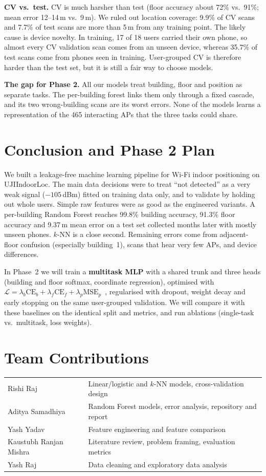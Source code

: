 \documentclass[conference]{IEEEtran}
\begin{document}
\textbf{CV vs.\ test.} CV is much harsher than test (floor accuracy about 72\% vs.\ 91\%; mean error 12--14\,m vs.\ 9\,m). We ruled out
location coverage: 9.9\% of CV scans and 7.7\% of test scans are more than 5\,m from any training point. The likely cause is device novelty.
In training, 17 of 18 users carried their own phone, so almost every CV validation scan comes from an unseen device, whereas 35.7\% of test
scans come from phones seen in training. User-grouped CV is therefore harder than the test set, but it is still a fair way to choose models.

\textbf{The gap for Phase 2.} All our models treat building, floor and position as separate tasks. The per-building forest links
them only through a fixed cascade, and its two wrong-building scans are its worst errors. None of the models learns a representation of the 465 interacting APs that the three tasks could share.

\section{Conclusion and Phase 2 Plan}
We built a leakage-free machine learning pipeline for Wi-Fi indoor positioning on UJIIndoorLoc. The main data
decisions were to treat ``not detected'' as a very weak signal ($-105$\,dBm) fitted on training data only, and to validate by holding out
whole users. Simple raw features were as good as the engineered variants. A per-building Random Forest reaches 99.8\%
building accuracy, 91.3\% floor accuracy and 9.37\,m mean error on a test set collected months later with mostly unseen phones.
$k$-NN is a close second. Remaining errors come from adjacent-floor confusion (especially building~1), scans that hear very few APs, and device differences.

In Phase~2 we will train a \textbf{multitask MLP} with a shared trunk and three heads (building and floor softmax, coordinate
regression), optimised with $\mathcal{L}=\lambda_b\mathrm{CE}_b+\lambda_f\mathrm{CE}_f+\lambda_p\mathrm{MSE}_p$~\cite{caruana1997mtl},
regularised with dropout, weight decay and early stopping on the same user-grouped validation. We will compare it with these baselines on the
identical split and metrics, and run ablations (single-task vs.\ multitask, loss weights).

\section*{Team Contributions}
\begin{tabular}{@{}p{}p{}@{}}
Rishi Raj & Linear/logistic and $k$-NN models, cross-validation design \\
Aditya Samadhiya & Random Forest models, error analysis, repository and report \\
Yash Yadav & Feature engineering and feature comparison \\
Kaustubh Ranjan Mishra & Literature review, problem framing, evaluation metrics \\
Yash Raj & Data cleaning and exploratory data analysis \\
\end{tabular}
\end{document}
